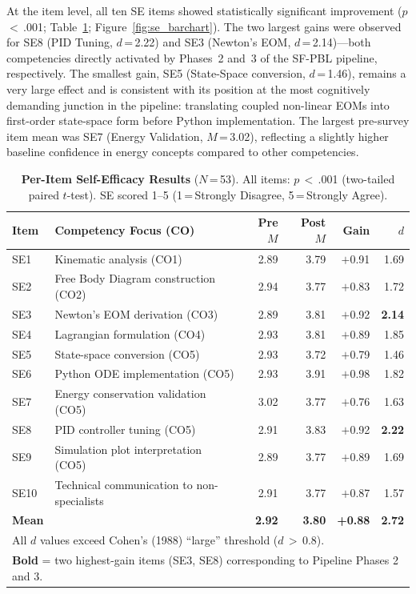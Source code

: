 \documentclass[utf8]{FrontiersinHarvard}
\begin{document}
At the item level, all ten SE items showed statistically significant
improvement ($p$\,$<$\,.001; Table~\ref{tab:se_items};
Figure~\ref{fig:se_barchart}). The two largest gains were observed for
SE8 (PID Tuning, $d$\,=\,2.22) and SE3 (Newton's EOM, $d$\,=\,2.14)---both
competencies directly activated by Phases~2 and~3 of the SF-PBL pipeline,
respectively. The smallest gain, SE5 (State-Space conversion, $d$\,=\,1.46),
remains a very large effect and is consistent with its position at the most
cognitively demanding junction in the pipeline: translating coupled
non-linear EOMs into first-order state-space form before Python
implementation. The largest pre-survey item mean was SE7 (Energy Validation,
$M$\,=\,3.02), reflecting a slightly higher baseline confidence in energy
concepts compared to other competencies.

\begin{table}[h]
\caption{\textbf{Per-Item Self-Efficacy Results} ($N$\,=\,53). All items:
$p$\,$<$\,.001 (two-tailed paired $t$-test). SE scored 1--5
(1\,=\,Strongly Disagree, 5\,=\,Strongly Agree).}
\label{tab:se_items}
\begin{tabular}{llrrrr}
\toprule
\textbf{Item} & \textbf{Competency Focus (CO)} &
\textbf{Pre $M$} & \textbf{Post $M$} & \textbf{Gain} & $d$ \\
\midrule
SE1  & Kinematic analysis (CO1)                 & 2.89 & 3.79 & $+$0.91 & 1.69 \\
SE2  & Free Body Diagram construction (CO2)     & 2.94 & 3.77 & $+$0.83 & 1.72 \\
SE3  & Newton's EOM derivation (CO3)            & 2.89 & 3.81 & $+$0.92 & \textbf{2.14} \\
SE4  & Lagrangian formulation (CO4)             & 2.93 & 3.81 & $+$0.89 & 1.85 \\
SE5  & State-space conversion (CO5)             & 2.93 & 3.72 & $+$0.79 & 1.46 \\
SE6  & Python ODE implementation (CO5)          & 2.93 & 3.91 & $+$0.98 & 1.82 \\
SE7  & Energy conservation validation (CO5)     & 3.02 & 3.77 & $+$0.76 & 1.63 \\
SE8  & PID controller tuning (CO5)              & 2.91 & 3.83 & $+$0.92 & \textbf{2.22} \\
SE9  & Simulation plot interpretation (CO5)     & 2.89 & 3.77 & $+$0.89 & 1.69 \\
SE10 & Technical communication to non-specialists & 2.91 & 3.77 & $+$0.87 & 1.57 \\
\midrule
\textbf{Mean} & & \textbf{2.92} & \textbf{3.80} & \textbf{+0.88} & \textbf{2.72} \\
\bottomrule
\multicolumn{6}{l}{\small All $d$ values exceed Cohen's (1988) ``large'' threshold ($d$\,$>$\,0.8).} \\
\multicolumn{6}{l}{\small \textbf{Bold} = two highest-gain items (SE3, SE8) corresponding to Pipeline Phases 2 and 3.} \\
\end{tabular}
\end{table}
\end{document}
